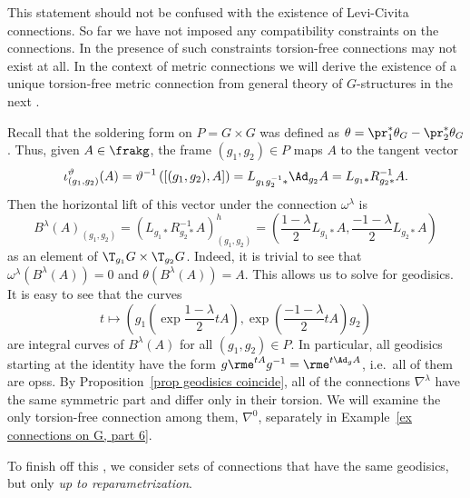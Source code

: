\begin{rem}
    This statement should not be confused with the existence of Levi-Civita connections. So far we have not imposed any compatibility constraints on the connections. In the presence of such constraints torsion-free connections may not exist at all. In the context of metric connections we will derive the existence of a unique torsion-free metric connection from general theory of $G$-structures in the next \subsect.
\end{rem}



\begin{example}\label{ex connections on G, part 5}
    Recall that the soldering form on $P=G\times G$ was defined as $\theta=\pr_1^\ast\theta_G-\pr_2^\ast\theta_G$. Thus, given $A\in\frakg$, the frame $(g_1,g_2)\in P$ maps $A$ to the tangent vector 
    \[\iota_{(g_1,g_2)}^\vartheta(A)=\vartheta^{-1}\left([(g_1,g_2),A]\right)=L_{g_1g_2^{-1}\ast}\Ad_{g_2}A=L_{g_1\ast}R_{g_2\ast}^{-1}A.\]
    Then the horizontal lift of this vector under the connection $\omega^\lambda$ is 
    \[B^\lambda(A)_{(g_1,g_2)}=(L_{g_1\ast}R_{g_2\ast}^{-1}A)_{(g_1,g_2)}^h=\left(\frac{1-\lambda}{2}L_{g_1\ast}A, \frac{-1-\lambda}{2}L_{g_2\ast}A\right)\]
    as an element of $\T_{g_1}G\times \T_{g_2}G$. Indeed, it is trivial to see that $\omega^\lambda(B^\lambda(A))=0$ and $\theta(B^\lambda(A))=A$. 
    This allows us to solve for geodisics. It is easy to see that the curves 
    \[t\mapsto \left(g_1\left(\exp\frac{1-\lambda}{2}tA\right),\exp\left(\frac{-1-\lambda}{2}tA\right)g_2\right)\] 
    are integral curves of $B^\lambda(A)$ for all $(g_1,g_2)\in P$. In particular, all geodisics starting at the identity have the form $g\rme^{tA}g^{-1}=\rme^{t\Ad_g A}$, i.e.\ all of them are \glspl{ops}. By Proposition~\ref{prop geodisics coincide}, all of the connections $\nabla^\lambda$ have the same symmetric part and differ only in their torsion. We will examine the only torsion-free connection among them, $\nabla^0$, separately in Example~\ref{ex connections on G, part 6}.
\end{example}



To finish off this \subsect, we consider sets of connections that have the same geodisics, but only \emph{up to reparametrization}.


